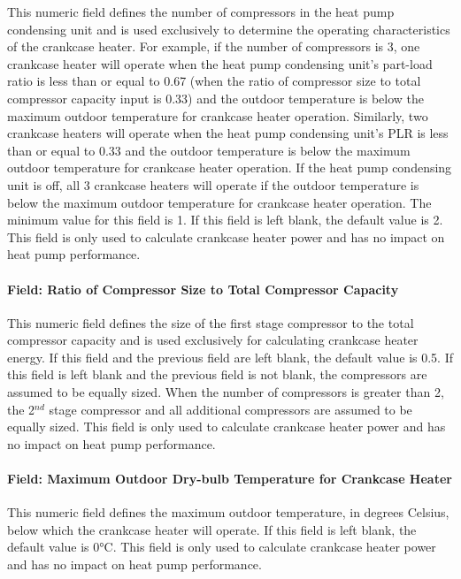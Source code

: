 This numeric field defines the number of compressors in the heat pump condensing unit and is used exclusively to determine the operating characteristics of the crankcase heater. For example, if the number of compressors is 3, one crankcase heater will operate when the heat pump condensing unit's part-load ratio is less than or equal to 0.67 (when the ratio of compressor size to total compressor capacity input is 0.33) and the outdoor temperature is below the maximum outdoor temperature for crankcase heater operation. Similarly, two crankcase heaters will operate when the heat pump condensing unit's PLR is less than or equal to 0.33 and the outdoor temperature is below the maximum outdoor temperature for crankcase heater operation. If the heat pump condensing unit is off, all 3 crankcase heaters will operate if the outdoor temperature is below the maximum outdoor temperature for crankcase heater operation. The minimum value for this field is 1. If this field is left blank, the default value is 2. This field is only used to calculate crankcase heater power and has no impact on heat pump performance.

\paragraph{Field: Ratio of Compressor Size to Total Compressor Capacity}\label{field-ratio-of-compressor-size-to-total-compressor-capacity}

This numeric field defines the size of the first stage compressor to the total compressor capacity and is used exclusively for calculating crankcase heater energy. If this field and the previous field are left blank, the default value is 0.5. If this field is left blank and the previous field is not blank, the compressors are assumed to be equally sized. When the number of compressors is greater than 2, the 2\(^{nd}\) stage compressor and all additional compressors are assumed to be equally sized. This field is only used to calculate crankcase heater power and has no impact on heat pump performance.

\paragraph{Field: Maximum Outdoor Dry-bulb Temperature for Crankcase Heater}\label{field-maximum-outdoor-dry-bulb-temperature-for-crankcase-heater}

This numeric field defines the maximum outdoor temperature, in degrees Celsius, below which the crankcase heater will operate. If this field is left blank, the default value is 0°C. This field is only used to calculate crankcase heater power and has no impact on heat pump performance.

